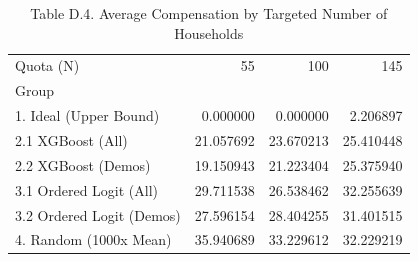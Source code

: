 \begin{table}
\caption{Table D.4. Average Compensation by Targeted Number of Households}
\begin{tabular}{lrrr}
\toprule
Quota (N) & 55 & 100 & 145 \\
Group &  &  &  \\
\midrule
1. Ideal (Upper Bound) & 0.000000 & 0.000000 & 2.206897 \\
2.1 XGBoost (All) & 21.057692 & 23.670213 & 25.410448 \\
2.2 XGBoost (Demos) & 19.150943 & 21.223404 & 25.375940 \\
3.1 Ordered Logit (All) & 29.711538 & 26.538462 & 32.255639 \\
3.2 Ordered Logit (Demos) & 27.596154 & 28.404255 & 31.401515 \\
4. Random (1000x Mean) & 35.940689 & 33.229612 & 32.229219 \\
\bottomrule
\end{tabular}
\end{table}
